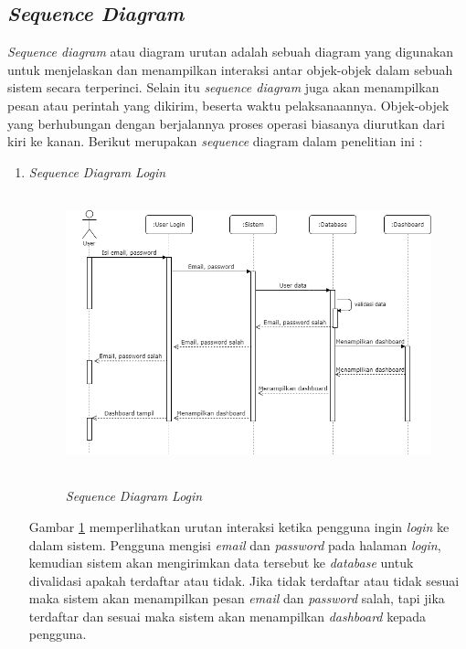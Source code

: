 \subsection{\textit{Sequence Diagram}}
\textit{Sequence diagram} atau diagram urutan adalah sebuah diagram yang digunakan untuk menjelaskan dan menampilkan interaksi antar objek-objek dalam sebuah sistem secara terperinci. Selain itu \textit{sequence diagram} juga akan menampilkan pesan atau perintah yang dikirim, beserta waktu pelaksanaannya. Objek-objek yang berhubungan dengan berjalannya proses operasi biasanya diurutkan dari kiri ke kanan. Berikut merupakan \textit{sequence} diagram dalam penelitian ini :

\begin{enumerate}
	\item \textit{Sequence Diagram Login}
	\begin{figure}[H]
		\centering
		{\includegraphics [width = 12cm, height= 8cm]{gambar/sequence/login}}
		\caption{\textit{Sequence Diagram Login}}
		\label{seq login}
	\end{figure}
	\newpage
	\par Gambar \ref*{seq login} memperlihatkan urutan interaksi ketika pengguna ingin \textit{login} ke dalam sistem. Pengguna mengisi \textit{email} dan \textit{password} pada halaman \textit{login}, kemudian sistem akan mengirimkan data tersebut ke \textit{database} untuk divalidasi apakah terdaftar atau tidak. Jika tidak terdaftar atau tidak sesuai maka sistem akan menampilkan pesan \textit{email} dan \textit{password} salah, tapi jika terdaftar dan sesuai maka sistem akan menampilkan \textit{dashboard} kepada pengguna.


\end{enumerate}
